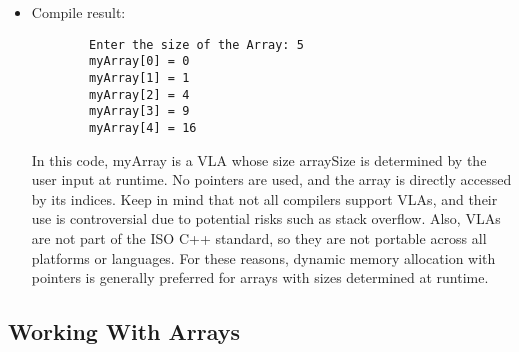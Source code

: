 \begin{itemize}
\begin{lstlisting}
int main(){
        int arraySize;
        
        //Ask the user for the array size:
        printf("Enter the size of the array: ");
        scanf("%d", &arraySize);
        
        //declare VLA based on the user input:
        int myArray[arraySize];
        
        //Intitialize array with values
        for (int i = 0; i < arraySize; i++){
                myArray[i] = i * i;
        }
        
        //Print array values:
        for (int i = 0; i < arraySize; i++){
        printf("myArray[%d] = %d\n", i, myArray[i]);
        }
        
        return 0;
}
\end{lstlisting}

      \item Compile result:
      \begin{lstlisting}
        Enter the size of the Array: 5
        myArray[0] = 0
        myArray[1] = 1
        myArray[2] = 4
        myArray[3] = 9
        myArray[4] = 16
      \end{lstlisting}
      In this code, myArray is a VLA whose size arraySize is determined by the user input at runtime. No pointers are used, and the array is directly accessed by its indices.
      Keep in mind that not all compilers support VLAs, and their use is controversial due to potential risks such as stack overflow. Also, VLAs are not part of the ISO C++ standard, so they are not portable across all platforms or languages. For these reasons, dynamic memory allocation with pointers is generally preferred for arrays with sizes determined at runtime.
    \end{itemize} 

\subsection{Working With Arrays}
